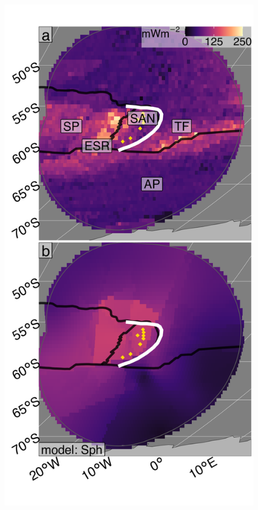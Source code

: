 \begin{figure}[htbp]

{\centering \includegraphics[width=1\linewidth,]{assets/figs/chpt3/ScotiaDiffComp} 

}


\end{figure}
